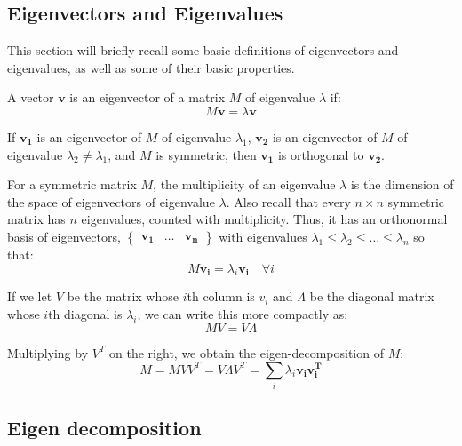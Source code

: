 \subsection{Eigenvectors and Eigenvalues}
\label{sec:eigenvectorsAndEigenvalues}
This section will briefly recall some basic definitions of eigenvectors and
eigenvalues, as well as some of their basic properties.

A vector $\mathbf{v}$ is an eigenvector of a matrix $M$ of eigenvalue $\lambda$ 
if:
\begin{equation}
M\mathbf{v} = \lambda\textbf{v}
\end{equation}

If $\mathbf{v_{1}}$ is an eigenvector of $M$ of eigenvalue $\lambda_{1}$, 
$\mathbf{v_{2}}$ is an eigenvector of $M$ of eigenvalue $\lambda_{2} \neq 
\lambda_{1}$, and $M$ is symmetric, then $\mathbf{v_{1}}$ is orthogonal to 
$\mathbf{v_{2}}$.

For a symmetric matrix $M$, the multiplicity of an eigenvalue $\lambda$ is the
dimension of the space of eigenvectors of eigenvalue $\lambda$. Also recall that
every $n{\times}n$ symmetric matrix has $n$ eigenvalues, counted with 
multiplicity. Thus, it has an orthonormal basis of eigenvectors, 
$\begin{Bmatrix} \mathbf{v_{1}} & \ldots & \mathbf{v_{n}} \end{Bmatrix}$ with
eigenvalues $\lambda_{1} \leq \lambda_{2} \leq \ldots \leq \lambda_{n}$ so that:
\begin{equation}
M\mathbf{v_{i}} = \lambda_{i}\mathbf{v_{i}} \quad \forall i
\end{equation}

If we let $V$ be the matrix whose $i$th column is $v_{i}$ and $\Lambda$ be the 
diagonal matrix whose $i$th diagonal is $\lambda_{i}$, we can write this more 
compactly as:
\begin{equation}
MV = V\Lambda
\end{equation}

Multiplying by $V^{T}$ on the right, we obtain the eigen-decomposition of $M$:
\begin{equation}
M = MVV^{T} = V{\Lambda}V^{T} = \sum_{i} \lambda_{i}\mathbf{v_{i}}\mathbf{v_{i}^{T}}
\end{equation}

\subsection{Eigen decomposition}
\label{sec:eigenDecomposition}

